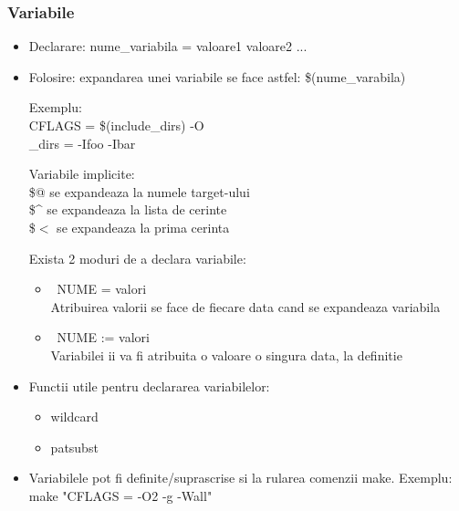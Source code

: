 \documentclass{beamer}
\begin{document}
    \begin{frame}[allowframebreaks]
    \frametitle{Variabile}
    \begin{itemize}
    \setlength{\itemsep}{0.6cm}
    \item Declarare: {\ttfamily nume\_variabila = valoare1 valoare2 ...}
    \item Folosire: expandarea unei variabile se face astfel: {\ttfamily\$(nume\_varabila)}
    \begin{item}
    Exemplu:\\{\ttfamily CFLAGS = \$(include\_dirs) -O\\_dirs = -Ifoo -Ibar}
    \end{item}
    \begin{item}
    Variabile implicite:\\
    \$@ se expandeaza la numele target-ului\\
    \$\^{} se expandeaza la lista de cerinte\\
    \$$<$ se expandeaza la prima cerinta
    \end{item}
    \begin{item}
    Exista 2 moduri de a declara variabile:
        \begin{itemize}
        \item \ttfamily\ NUME = valori\normalfont\\Atribuirea valorii se face de fiecare data cand se expandeaza variabila
        \item \ttfamily\ NUME := valori\normalfont\\Variabilei ii va fi atribuita o valoare o singura data, la definitie
        \end{itemize}
    \end{item}
    \item Functii utile pentru declararea variabilelor:\\\begin{itemize}\item wildcard\item patsubst\end{itemize}
    \item Variabilele pot fi definite/suprascrise si la rularea comenzii make. Exemplu:\\{\ttfamily make "CFLAGS = -O2 -g -Wall"}
    \end{itemize}
    \end{frame}
\end{document}
